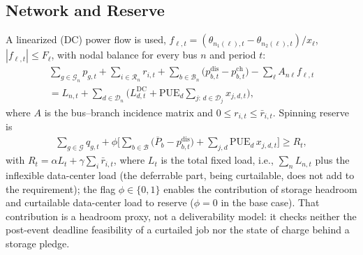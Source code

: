 \documentclass[conference]{IEEEtran}
\begin{document}
\subsection{Network and Reserve}
A linearized (DC) power flow is used, $f_{\ell,t} = (\theta_{n_1(\ell),t} - \theta_{n_2(\ell),t})/x_\ell$, $|f_{\ell,t}| \le F_\ell$, with nodal balance for every bus $n$ and period $t$:
\begin{multline}
\sum_{g\in\mathcal{G}_n} p_{g,t} + \sum_{i\in\mathcal{R}_n} r_{i,t} + \sum_{b\in\mathcal{B}_n} \big(p^{\mathrm{dis}}_{b,t} - p^{\mathrm{ch}}_{b,t}\big) - \sum_{\ell} A_{n\ell} f_{\ell,t} \\
= L_{n,t} + \sum_{d\in\mathcal{D}_n}\Big( L^{\mathrm{DC}}_{d,t} + \mathrm{PUE}_d \sum_{j:\, d\in\mathcal{D}_j} x_{j,d,t} \Big),
\label{eq:balance}
\end{multline}
where $A$ is the bus--branch incidence matrix and $0 \le r_{i,t} \le \bar{r}_{i,t}$. Spinning reserve is
\begin{align}
\sum_{g\in\mathcal{G}} q_{g,t} + \phi \Big[ \sum_{b\in\mathcal{B}}\big(\overline{P}_b - p^{\mathrm{dis}}_{b,t}\big) + \sum_{j,d} \mathrm{PUE}_d\, x_{j,d,t} \Big] \ge R_t,
\label{eq:reserve}
\end{align}
with $R_t = \alpha L_t + \gamma \sum_i \bar{r}_{i,t}$, where $L_t$ is the total fixed load, i.e., $\sum_n L_{n,t}$ plus the inflexible data-center load (the deferrable part, being curtailable, does not add to the requirement); the flag $\phi\in\{0,1\}$ enables the contribution of storage headroom and curtailable data-center load to reserve ($\phi=0$ in the base case). That contribution is a headroom proxy, not a deliverability model: it checks neither the post-event deadline feasibility of a curtailed job nor the state of charge behind a storage pledge.
\end{document}

